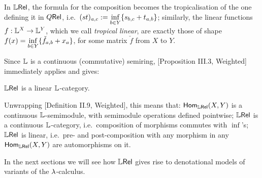 \begin{remark}
 In $\mathbb{L} \mathsf{Rel}$, the formula for the composition becomes the tropicalisation of the one defining it in $Q \mathsf{Rel}$, i.e.\ $(st)_{a,c}:=\inf\limits_{b\in Y}\{s_{b,c}+t_{a,b}\}$;
 similarly, the linear functions $f:\mathbb{L}^X\to \mathbb{L}^Y$, which we call \emph{tropical linear}, are exactly those of shape $f(x)=\inf\limits_{b\in Y} \{\check f_{a,b}+x_a\}$, for some matrix $\check f$ from $X$ to $Y$.
\end{remark}

Since $\mathbb{L}$ is a continuous (commutative) semiring, [Proposition III.3, Weighted] immediately applies and gives:

\begin{fact}
 $\mathbb{L} \mathsf{Rel}$ is a linear $\mathbb{L}$-category.
\end{fact}

Unwrapping [Definition II.9, Weighted], this means that:
$\mathsf{Hom}_{\mathbb{L} \mathsf{Rel}}(X,Y)$ is a continuous $\mathbb{L}$-semimodule, with semimodule operations defined pointwise;
$\mathbb{L} \mathsf{Rel}$ is a continuous $\mathbb{L}$-category, i.e.\ composition of morphisms commutes with $\inf$'s;
$\mathbb{L} \mathsf{Rel}$ is linear, i.e.\ pre- and post-composition with any morphism in any $\mathsf{Hom}_{\mathbb{L} \mathsf{Rel}}(X,Y)$ are automorphisms on it.

In the next sections we will see how $\mathbb{L} \mathsf{Rel}$ gives rise to denotational models of variants of the $\lambda$-calculus.
